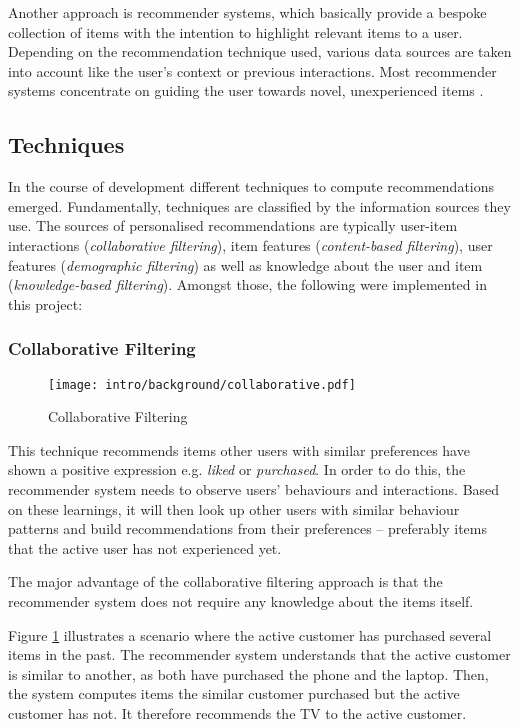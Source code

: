 Another approach is recommender systems, which basically provide a bespoke collection of items with the intention to highlight relevant items to a user. Depending on the recommendation technique used, various data sources are taken into account like the user's context or previous interactions. Most recommender systems concentrate on guiding the user towards novel, unexperienced items \cite{herlocker04}.

\subsection{Techniques}

In the course of development different techniques to compute recommendations emerged. Fundamentally, techniques are classified by the information sources they use. The sources of personalised recommendations are typically user-item interactions (\emph{collaborative filtering}), item features (\emph{content-based filtering}), user features (\emph{demographic filtering}) as well as knowledge about the user and item (\emph{knowledge-based filtering}). Amongst those, the following were implemented in this project:

\subsubsection{Collaborative Filtering}
\label{intro-bg-tech-collaborative}

\begin{figure}[ht]
    \texttt{[image: intro/background/collaborative.pdf]}
    \caption{Collaborative Filtering}
    \label{fig:collaborative}
\end{figure}

This technique recommends items other users with similar preferences have shown a positive expression e.g. \emph{liked} or \emph{purchased}. In order to do this, the recommender system needs to observe users' behaviours and interactions. Based on these learnings, it will then look up other users with similar behaviour patterns and build recommendations from their preferences -- preferably items that the active user has not experienced yet.

The major advantage of the collaborative filtering approach is that the recommender system does not require any knowledge about the items itself.

Figure \ref{fig:collaborative} illustrates a scenario where the active customer has purchased several items in the past. The recommender system understands that the active customer is similar to another, as both have purchased the phone and the laptop. Then, the system computes items the similar customer purchased but the active customer has not. It therefore recommends the TV to the active customer.

